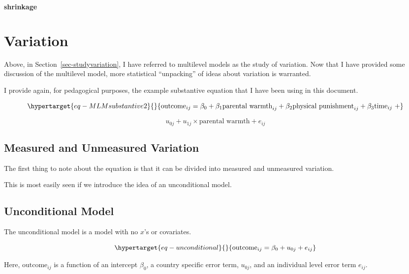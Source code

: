 \documentclass[
  letterpaper,
  DIV=11,
  numbers=noendperiod]{scrreprt}
\begin{document}
\textbf{shrinkage}

\hypertarget{variation}{%
\section{Variation}\label{variation}}

Above, in Section~\ref{sec-studyvariation}, I have referred to
multilevel models as the study of variation. Now that I have provided
some discussion of the multilevel model, more statistical ``unpacking''
of ideas about variation is warranted.

I provide again, for pedagogical purposes, the example substantive
equation that I have been using in this document.

\begin{equation}\protect\hypertarget{eq-MLMsubstantive2}{}{\text{outcome}_{ij} = \beta_0 + \beta_1 \text{parental warmth}_{ij} + \beta_2 \text{physical punishment}_{ij} + \beta_3 \text{time}_{ij} \ + }\label{eq-MLMsubstantive2}\end{equation}

\[u_{0j} + u_{1j} \times \text{parental warmth} + e_{ij}\]

\hypertarget{measured-and-unmeasured-variation}{%
\subsection{Measured and Unmeasured
Variation}\label{measured-and-unmeasured-variation}}

The first thing to note about the equation is that it can be divided
into measured and unmeasured variation.

This is most easily seen if we introduce the idea of an unconditional
model.

\hypertarget{unconditional-model}{%
\subsection{Unconditional Model}\label{unconditional-model}}

The unconditional model is a model with no \(x\)'s or covariates.

\begin{equation}\protect\hypertarget{eq-unconditional}{}{\text{outcome}_{ij} = \beta_0 + u_{0j} + e_{ij}}\label{eq-unconditional}\end{equation}

Here, \(\text{outcome}_{ij}\) is a function of an intercept \(\beta_0\),
a country specific error term, \(u_{0j}\), and an individual level error
term \(e_{ij}\).
\end{document}
